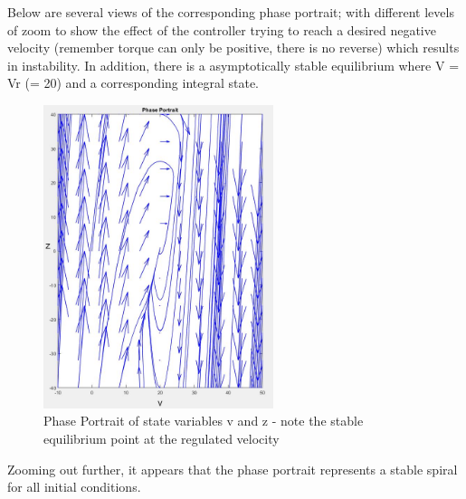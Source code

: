 \documentclass[12pt]{article}
\begin{document}
\clearpage

Below are several views of the corresponding phase portrait; with different levels of zoom to show the effect of the controller trying to reach a desired negative velocity (remember torque can only be positive, there is no reverse) which results in instability. In addition, there is a asymptotically stable equilibrium where V = Vr (= 20) and a corresponding integral state.


\begin{center}
\begin{figure}[htb]
	\includegraphics[width=0.6\textwidth]{A2_phaseportrait_1.jpg}
\caption{Phase Portrait of state variables v and z - note the stable equilibrium point at the regulated velocity}
\end{figure}
\end{center}


\clearpage

Zooming out further, it appears that the phase portrait represents a stable spiral for all initial conditions.
\end{document}
